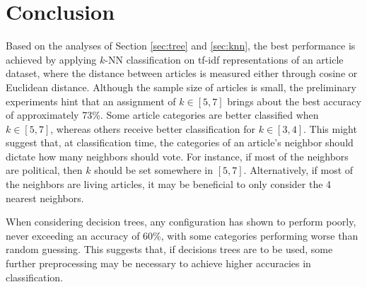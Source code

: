 \documentclass[11pt]{article}
\begin{document}
\section{Conclusion}

Based on the analyses of Section \ref{sec:tree} and \ref{sec:knn}, the best performance is achieved by applying $k$-NN classification on tf-idf representations of an article dataset, where the distance between articles is measured either through cosine or Euclidean distance.
Although the sample size of articles is small, the preliminary experiments hint that an assignment of $k \in [ 5, 7 ]$ brings about the best accuracy of approximately 73\%.
Some article categories are better classified when $k \in [5,7]$, whereas others receive better classification for $k \in [3,4]$.
This might suggest that, at classification time, the categories of an article's neighbor should dictate how many neighbors should vote.
For instance, if most of the neighbors are political, then $k$ should be set somewhere in $[5,7]$.
Alternatively, if most of the neighbors are living articles, it may be beneficial to only consider the 4 nearest neighbors.

When considering decision trees, any configuration has shown to perform poorly, never exceeding an accuracy of 60\%, with some categories performing worse than random guessing.
This suggests that, if decisions trees are to be used, some further preprocessing may be necessary to achieve higher accuracies in classification.

{}

\end{document}

